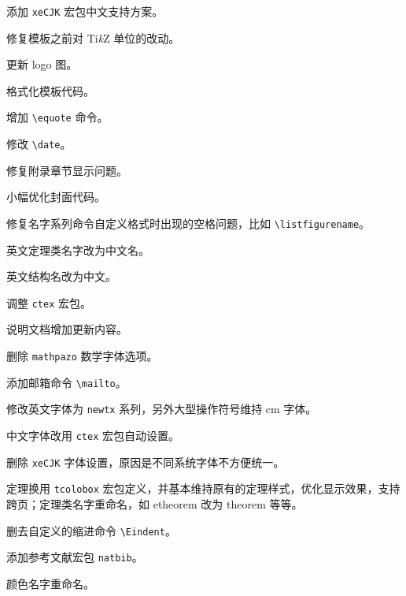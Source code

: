 \documentclass[cn,11pt]{elegantbook}
\begin{document}

\begin{change}
  \item 添加 \lstinline{xeCJK} 宏包中文支持方案。
  \item 修复模板之前对 Ti\textit{k}Z 单位的改动。
  \item 更新 logo 图。
\end{change}


\begin{change}
  \item 格式化模板代码。
  \item 增加 \lstinline{\equote} 命令。
  \item 修改 \lstinline{\date}。
\end{change}


\begin{change}
  \item 修复附录章节显示问题。
  \item 小幅优化封面代码。
\end{change}


\begin{change}
  \item 修复名字系列命令自定义格式时出现的空格问题，比如 \lstinline{\listfigurename}。
  \item 英文定理类名字改为中文名。
  \item 英文结构名改为中文。
\end{change}


\begin{change}
  \item 调整 \lstinline{ctex} 宏包。
  \item 说明文档增加更新内容。
\end{change}


\begin{change}
  \item 删除 \lstinline{mathpazo} 数学字体选项。
  \item 添加邮箱命令 \lstinline{\mailto}。
  \item 修改英文字体为 \lstinline{newtx} 系列，另外大型操作符号维持 cm 字体。
  \item 中文字体改用 \lstinline{ctex} 宏包自动设置。
  \item 删除 \lstinline{xeCJK} 字体设置，原因是不同系统字体不方便统一。
  \item 定理换用 \lstinline{tcolobox} 宏包定义，并基本维持原有的定理样式，优化显示效果，支持跨页；定理类名字重命名，如 etheorem 改为 theorem 等等。
  \item 删去自定义的缩进命令 \lstinline{\Eindent}。
  \item 添加参考文献宏包 \lstinline{natbib}。
  \item 颜色名字重命名。
\end{change}
\end{document}
